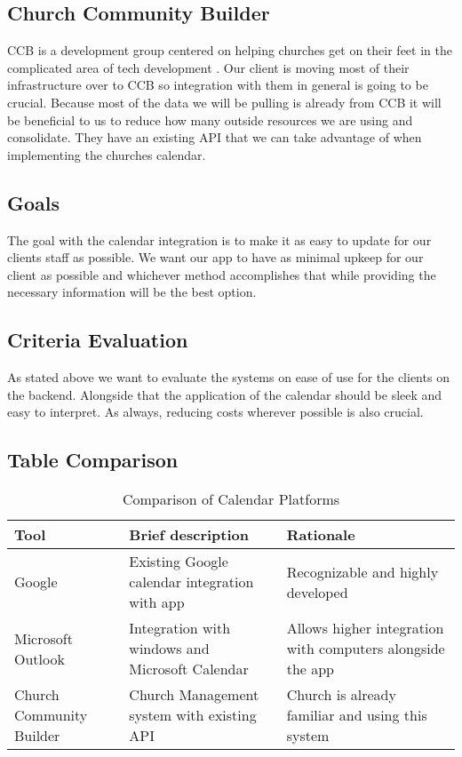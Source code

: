 \documentclass[letterpaper,10pt,draftclsnofoot,onecolumn,titlepage]{IEEEtran}
\begin{document}
	\subsection{Church Community Builder}
	CCB is a development group centered on helping churches get on their feet in the complicated area of tech development \cite{CCB}. Our client is moving most of their infrastructure over to CCB so integration with them in general is going to be crucial. Because most of the data we will be pulling is already from CCB it will be beneficial to us to reduce how many outside resources we are using and consolidate. They have an existing API that we can take advantage of when implementing the churches calendar.
	\subsection{Goals}
	The goal with the calendar integration is to make it as easy to update for our clients staff as possible. We want our app to have as minimal upkeep for our client as possible and whichever method accomplishes that while providing the necessary information will be the best option.
	\subsection{Criteria Evaluation}
	As stated above we want to evaluate the systems on ease of use for the clients on the backend. Alongside that the application of the calendar should be sleek and easy to interpret. As always, reducing costs wherever possible is also crucial.
	\subsection{Table Comparison}
	\begin{table}[ht]
	\caption{Comparison of Calendar Platforms}
	\begin{center}
	\begin{tabular} { | m{3cm} | m{5cm} | m{5cm} | }
	\hline\hline
	Tool & Brief description & Rationale \\ [0.5ex]
	\hline
	Google & Existing Google calendar integration with app & Recognizable and highly developed \\
	\hline
	Microsoft Outlook & Integration with windows and Microsoft Calendar & Allows higher integration with computers alongside the app \\
	\hline
	Church Community Builder & Church Management system with existing API & Church is already familiar and using this system \\
	\hline
	\end{tabular}
	\end{center}
	\end{table}
\end{document}
